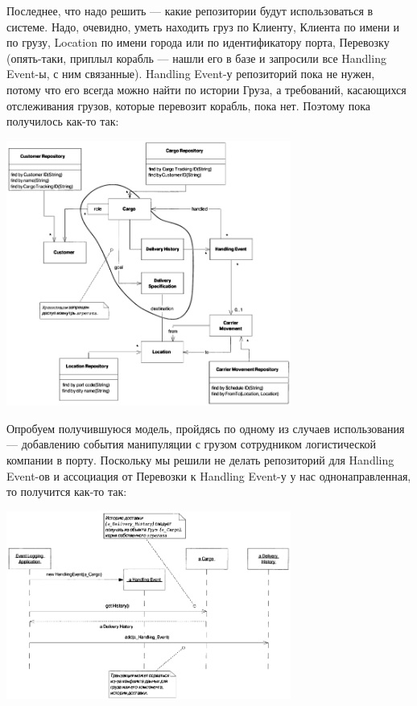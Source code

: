 \documentclass[a5paper]{article}
\begin{document}
Последнее, что надо решить --- какие репозитории будут использоваться в системе. Надо, очевидно, уметь находить груз по Клиенту, Клиента по имени и по грузу, Location по имени города или по идентификатору порта, Перевозку (опять-таки, приплыл корабль --- нашли его в базе и запросили все Handling Event-ы, с ним связанные). Handling Event-у репозиторий пока не нужен, потому что его всегда можно найти по истории Груза, а требований, касающихся отслеживания грузов, которые перевозит корабль, пока нет. Поэтому пока получилось как-то так:

\begin{center}
    \includegraphics[width=0.7\textwidth]{cargoRepositories.png}
\end{center}

Опробуем получившуюся модель, пройдясь по одному из случаев использования --- добавлению события манипуляции с грузом сотрудником логистической компании в порту. Поскольку мы решили не делать репозиторий для Handling Event-ов и ассоциация от Перевозки к Handling Event-у у нас однонаправленная, то получится как-то так:

\begin{center}
    \includegraphics[width=0.7\textwidth]{cargoAddEvent.png}
\end{center}
\end{document}
